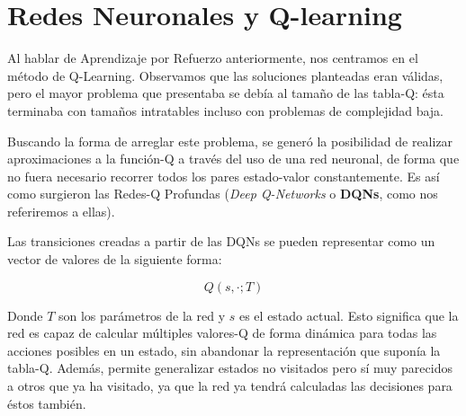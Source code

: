 \section{Redes Neuronales y Q-learning}

Al hablar de Aprendizaje por Refuerzo anteriormente, nos centramos en el método de Q-Learning. Observamos que las soluciones planteadas eran válidas, pero el mayor problema que presentaba se debía al tamaño de las tabla-Q: ésta terminaba con tamaños intratables incluso con problemas de complejidad baja. 

Buscando la forma de arreglar este problema, se generó la posibilidad de realizar aproximaciones a la función-Q a través del uso de una red neuronal, de forma que no fuera necesario recorrer todos los pares estado-valor constantemente. Es así como surgieron las Redes-Q Profundas (\textit{Deep Q-Networks} o \textbf{DQNs}, como nos referiremos a ellas). 

Las transiciones creadas a partir de las DQNs se pueden representar como un vector de valores de la siguiente forma: 

$$Q(s, · ; T )$$ 

Donde $T$ son los parámetros de la red y $s$ es el estado actual. Esto significa que la red es capaz de calcular múltiples valores-Q de forma dinámica para todas las acciones posibles en un estado, sin abandonar la representación que suponía la tabla-Q. Además, permite generalizar estados no visitados pero sí muy parecidos a otros que ya ha visitado, ya que la red ya tendrá calculadas las decisiones para éstos también.
